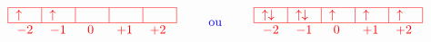\[
    \textcolor{red}{
        \begin{array}{c c c}
            \begin{array}{c}
                \begin{tabular}{|m{0.5cm}|m{0.5cm}|m{0.5cm}|m{0.5cm}|m{0.5cm}|}
                    \hline
                    $\uparrow$ & $\uparrow$ &  &  & \\
                    \hline
                \end{tabular} \\
                \begin{tabular}{m{0.5cm} m{0.5cm} m{0.5cm} m{0.5cm} m{0.5cm}}
                    $-2$ & $-1$ & \text{ 0 } & $+1$ & $+2$
                \end{tabular}
            \end{array}
             & 
            \quad \text{\textcolor{blue}{ou}} \quad
             & 
            \begin{array}{c}
                \begin{tabular}{|m{0.5cm}|m{0.5cm}|m{0.5cm}|m{0.5cm}|m{0.5cm}|}
                    \hline
                    $\uparrow \downarrow$ & $\uparrow\downarrow$ & $\uparrow$ & $\uparrow$ & $\uparrow$ \\
                    \hline
                \end{tabular} \\
                \begin{tabular}{m{0.5cm} m{0.5cm} m{0.5cm} m{0.5cm} m{0.5cm}}
                    $-2$ & $-1$ & \text{ 0 } & $+1$ & $+2$
                \end{tabular}
            \end{array}
        \end{array}
    }
\]